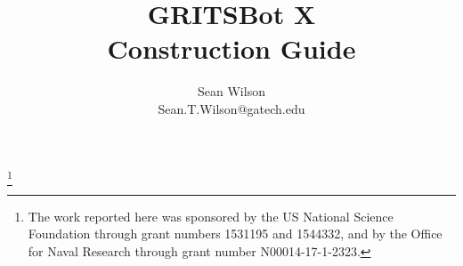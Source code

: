\documentclass[11pt]{article} %
\begin{document}
%

\title{GRITSBot X \\ \Large{Construction Guide}}

\author{Sean Wilson\\Sean.T.Wilson@gatech.edu}%

\maketitle
\thispagestyle{empty} %

\tableofcontents
\clearpage

{\let\thefootnote\relax\footnote{The work reported here was sponsored by the US National Science Foundation through grant numbers 1531195 and 1544332, and by the Office for Naval Research through grant number N00014-17-1-2323.}}







\clearpage


\end{document}
